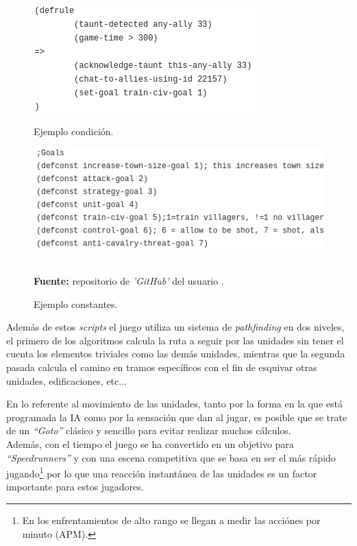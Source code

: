 \begin{figure}[ht]
\centering
\begin{minipage}[c]{0.45\linewidth}
	\hspace{9mm}
	\includegraphics[height=0.11\textheight]{imagenes/marco_teo/referentes/aoe_scripting_3.png}
	\caption{Ejemplo condición.}
	\label{img:aoe_script_3}
\end{minipage}
\begin{minipage}[c]{0.45\linewidth}
	\hspace{2mm}
	\includegraphics[height=0.11\textheight]{imagenes/marco_teo/referentes/aoe_scripting_4.png}
	\caption{Ejemplo constantes.}
	\label{img:aoe_script_4}
\end{minipage}\\[3mm]
\textbf{Fuente:} repositorio de \textit{'GitHub'} del usuario \citeauthor*{Andygmb2014}. 
\label{img:aoe_scripting_2}	
\end{figure}

Además de estos \textit{scripts} el juego utiliza un sistema de \textit{pathfinding} en dos niveles,
el primero de los algoritmos calcula la ruta a seguir por las unidades sin tener el cuenta los
elementos triviales como las demás unidades, mientras que la segunda pasada calcula el camino 
en tramos específicos con el fin de esquivar otras unidades, edificaciones, etc...

En lo referente al movimiento de las unidades, tanto por la forma en la que está programada
la \ac{IA} como por la sensación que dan al jugar, es posible que se trate de un  \textit{``Goto''}
clásico y sencillo para evitar realizar muchos cálculos. \\
Además, con el tiempo el juego se ha convertido en un objetivo para \textit{``Speedrunners''}
y con una escena competitiva que se basa en ser el más rápido jugando\footnote{En los enfrentamientos de alto rango se llegan a medir las acciónes por minuto (APM).}
por lo que una reacción instantánea de las unidades es un factor importante para  estos
jugadores.

